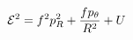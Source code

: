 \documentclass[preview]{standalone}
\begin{document}
\begin{align*}
\mathcal{E}^2=f^2p_R^2+{fp_\theta\over R^2}+U
\end{align*}
\end{document}
